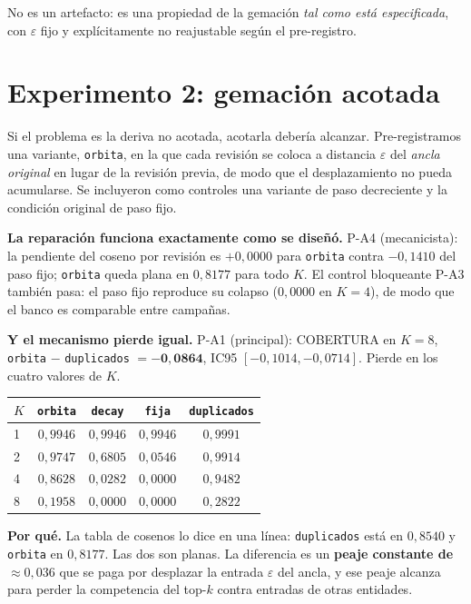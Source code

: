 \documentclass[11pt,a4paper]{article}
\begin{document}
No es un artefacto: es una propiedad de la gemación \emph{tal como está especificada}, con
$\varepsilon$ fijo y explícitamente no reajustable según el pre-registro.

\section{Experimento 2: gemación acotada}
\label{sec:e2}

Si el problema es la deriva no acotada, acotarla debería alcanzar. Pre-registramos una variante,
\texttt{orbita}, en la que cada revisión se coloca a distancia $\varepsilon$ del \emph{ancla
original} en lugar de la revisión previa, de modo que el desplazamiento no pueda acumularse. Se
incluyeron como controles una variante de paso decreciente y la condición original de paso fijo.

\textbf{La reparación funciona exactamente como se diseñó.} P-A4 (mecanicista): la pendiente del
coseno por revisión es $+0{,}0000$ para \texttt{orbita} contra $-0{,}1410$ del paso fijo;
\texttt{orbita} queda plana en $0{,}8177$ para todo $K$. El control bloqueante P-A3 también pasa: el
paso fijo reproduce su colapso ($0{,}0000$ en $K=4$), de modo que el banco es comparable entre
campañas.

\textbf{Y el mecanismo pierde igual.} P-A1 (principal): COBERTURA en $K=8$, \texttt{orbita} $-$
\texttt{duplicados} $= \mathbf{-0{,}0864}$, IC95 $[-0{,}1014, -0{,}0714]$. Pierde en los cuatro
valores de $K$.

\begin{center}
\begin{tabular}{lcccc}
\toprule
$K$ & \texttt{orbita} & \texttt{decay} & \texttt{fija} & \texttt{duplicados} \\
\midrule
1 & $0{,}9946$ & $0{,}9946$ & $0{,}9946$ & $0{,}9991$ \\
2 & $0{,}9747$ & $0{,}6805$ & $0{,}0546$ & $0{,}9914$ \\
4 & $0{,}8628$ & $0{,}0282$ & $0{,}0000$ & $0{,}9482$ \\
8 & $0{,}1958$ & $0{,}0000$ & $0{,}0000$ & $0{,}2822$ \\
\bottomrule
\end{tabular}
\end{center}

\textbf{Por qué.} La tabla de cosenos lo dice en una línea: \texttt{duplicados} está en $0{,}8540$ y
\texttt{orbita} en $0{,}8177$. Las dos son planas. La diferencia es un \textbf{peaje constante de
$\approx 0{,}036$} que se paga por desplazar la entrada $\varepsilon$ del ancla, y ese peaje alcanza
para perder la competencia del top-$k$ contra entradas de otras entidades.
\end{document}
